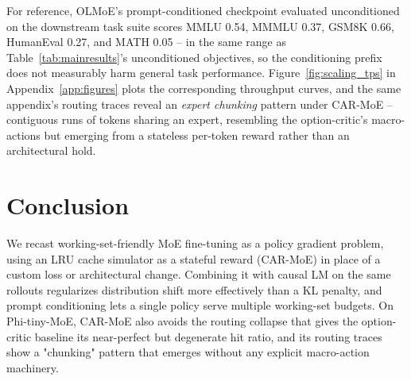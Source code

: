 \documentclass{article}
\begin{document}
For reference, OLMoE's prompt-conditioned checkpoint evaluated unconditioned on the
downstream task suite scores MMLU 0.54, MMMLU 0.37, GSM8K 0.66, HumanEval 0.27, and
MATH 0.05 -- in the same range as Table~\ref{tab:mainresults}'s unconditioned objectives,
so the conditioning prefix does not measurably harm general task performance.
Figure~\ref{fig:scaling_tps} in Appendix~\ref{app:figures} plots the corresponding
throughput curves, and the same appendix's routing traces reveal an \emph{expert
chunking} pattern under CAR-MoE -- contiguous runs of tokens sharing an expert,
resembling the option-critic's macro-actions but emerging from a
stateless per-token reward rather than an architectural hold.

\section{Conclusion}

We recast working-set-friendly MoE fine-tuning as a policy gradient problem, using an LRU
cache simulator as a stateful reward (CAR-MoE) in place of a custom loss or architectural
change. Combining it with causal LM on the same rollouts regularizes distribution shift
more effectively than a KL penalty, and prompt conditioning lets a single policy serve
multiple working-set budgets. On Phi-tiny-MoE, CAR-MoE also avoids the routing collapse
that gives the option-critic baseline its near-perfect but degenerate hit ratio, and its
routing traces show a "chunking" pattern that emerges without any explicit macro-action
machinery.
\end{document}
